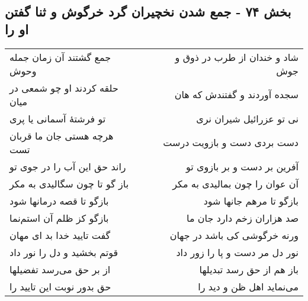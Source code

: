 \begin{center}
\section*{بخش ۷۴ - جمع شدن نخچیران گرد خرگوش و ثنا گفتن او را}
\label{sec:sh074}
\begin{longtable}{l p{0.5cm} r}
جمع گشتند آن زمان جمله وحوش
&&
شاد و خندان از طرب در ذوق و جوش
\\
حلقه کردند او چو شمعی در میان
&&
سجده آوردند و گفتندش که هان
\\
تو فرشتهٔ آسمانی یا پری
&&
نی تو عزرائیل شیران نری
\\
هرچه هستی جان ما قربان تست
&&
دست بردی دست و بازویت درست
\\
راند حق این آب را در جوی تو
&&
آفرین بر دست و بر بازوی تو
\\
باز گو تا چون سگالیدی به مکر
&&
آن عوان را چون بمالیدی به مکر
\\
بازگو تا قصه درمانها شود
&&
بازگو تا مرهم جانها شود
\\
بازگو کز ظلم آن استم‌نما
&&
صد هزاران زخم دارد جان ما
\\
گفت تایید خدا بد ای مهان
&&
ورنه خرگوشی کی باشد در جهان
\\
قوتم بخشید و دل را نور داد
&&
نور دل مر دست و پا را زور داد
\\
از بر حق می‌رسد تفضیلها
&&
باز هم از حق رسد تبدیلها
\\
حق بدور نوبت این تایید را
&&
می‌نماید اهل ظن و دید را
\\
\end{longtable}
\end{center}
